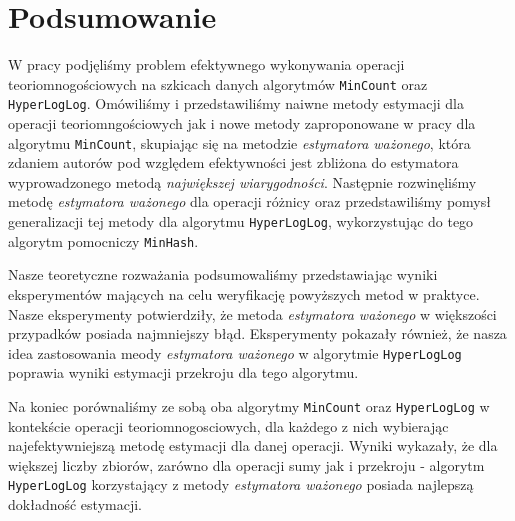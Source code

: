 \chapter{Podsumowanie}
\thispagestyle{chapterBeginStyle}

W pracy podjęliśmy problem
efektywnego wykonywania operacji teoriomnogościowych na szkicach danych algorytmów \texttt{MinCount} oraz \texttt{HyperLogLog}.
Omówiliśmy i przedstawiliśmy naiwne metody estymacji dla operacji teoriomngościowych jak i nowe metody zaproponowane w pracy \cite{ting} dla algorytmu \texttt{MinCount}, skupiając się na metodzie \textit{estymatora ważonego}, która zdaniem autorów pod względem efektywności jest zbliżona do estymatora wyprowadzonego metodą \textit{największej wiarygodności}. Następnie rozwinęliśmy 
metodę
\textit{estymatora ważonego} dla operacji różnicy oraz przedstawiliśmy pomysł generalizacji tej metody dla algorytmu \texttt{HyperLogLog}, wykorzystując do tego algorytm pomocniczy \texttt{MinHash}.

Nasze teoretyczne rozważania podsumowaliśmy przedstawiając wyniki eksperymentów mających na celu weryfikację powyższych metod w praktyce. Nasze eksperymenty potwierdziły, że metoda \textit{estymatora ważonego} w większości przypadków posiada najmniejszy błąd. Eksperymenty pokazały również, że nasza idea zastosowania meody \textit{estymatora ważonego} w algorytmie \texttt{HyperLogLog} poprawia wyniki estymacji przekroju dla tego algorytmu.

Na koniec porównaliśmy ze sobą oba algorytmy \texttt{MinCount} oraz \texttt{HyperLogLog} w kontekście operacji teoriomnogosciowych, dla każdego z nich wybierając najefektywniejszą metodę estymacji dla danej operacji. Wyniki wykazały, że dla większej liczby zbiorów, zarówno dla operacji sumy jak i przekroju - algorytm \texttt{HyperLogLog} korzystający z metody \textit{estymatora ważonego} posiada najlepszą dokładność estymacji.



